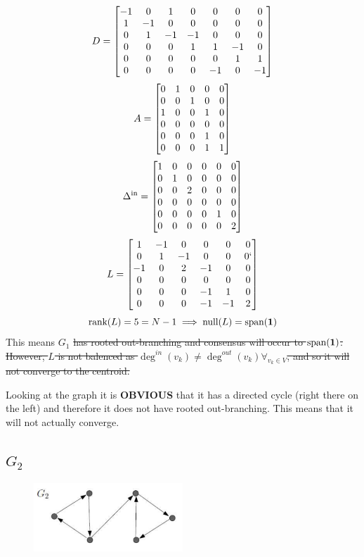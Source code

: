 \documentclass[]{article}
\numberwithin{equation}{section}
\begin{document}
\[
    D = \mqty[
        -1 & 0  & 1  & 0  & 0  & 0  & 0  \\
        1  & -1 & 0  & 0  & 0  & 0  & 0  \\
        0  & 1  & -1 & -1 & 0  & 0  & 0  \\
        0  & 0  & 0  & 1  & 1  & -1 & 0  \\
        0  & 0  & 0  & 0  & 0  & 1  & 1  \\
        0  & 0  & 0  & 0  & -1 & 0  & -1
    ]
\]\[
    A = \mqty[
        0 & 1 & 0 & 0 & 0 \\
        0 & 0 & 1 & 0 & 0 \\
        1 & 0 & 0 & 1 & 0 \\
        0 & 0 & 0 & 0 & 0 \\
        0 & 0 & 0 & 1 & 0 \\
        0 & 0 & 0 & 1 & 1
    ]
\]\[
    \Delta^{\text{in}} = \mqty[
        1 & 0 & 0 & 0 & 0 & 0 \\
        0 & 1 & 0 & 0 & 0 & 0 \\
        0 & 0 & 2 & 0 & 0 & 0 \\
        0 & 0 & 0 & 0 & 0 & 0 \\
        0 & 0 & 0 & 0 & 1 & 0 \\
        0 & 0 & 0 & 0 & 0 & 2
    ]
\]\[
    L = \mqty[
        1  & -1 & 0  & 0  & 0  & 0 \\
        0  & 1  & -1 & 0  & 0  & 0 `\\
        -1 & 0  & 2  & -1 & 0  & 0 \\
        0  & 0  & 0  & 0  & 0  & 0 \\
        0  & 0  & 0  & -1 & 1  & 0 \\
        0  & 0  & 0  & -1 & -1 & 2
    ]
\] \[
    \text{rank}(L) = 5 = N-1 \implies \text{null}(L) = \text{span}(\vb{1})
\] This means $G_1$ \sout{has rooted out-branching and consensus will occur to $\text{span}(\vb{1})$.
However, $L$ is not balenced as $\deg^{in}(v_k) \neq \deg^{out}(v_k) \forall_{v_k \in V}$, {\color{red} and so it will not converge to the centroid.}
}

{\color{red}
    Looking at the graph it is \textbf{OBVIOUS} that it has a directed cycle (right there on the left) and therefore it does not have rooted out-branching.
    This means that it will not actually converge.
}


\newpage
\subsection{$G_2$}
\begin{figure}[h]
    \centering
    \includegraphics[width=0.5\textwidth]{figs/pblm6b.png}
\end{figure}
\end{document}
